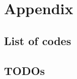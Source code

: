 \documentclass[12pt,notitlepage]{article}
\begin{document}

\clearpage
\renewcommand*{\bibfont}{\normalfont\small}
\printbibliography %




\section{Appendix}

\subsection{List of codes} \label{s:code}

\begin{center}
\SHOWCODES
\end{center}


\subsection{TODOs} 
\SHOWTODOS



\leavevmode\vfill{\tiny\color{lightgray}\hfill{\DTMnow}}
\end{document}

